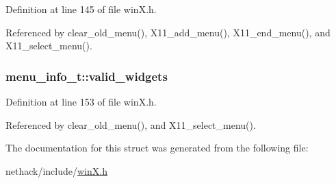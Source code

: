 Definition at line 145 of file win\+X.\+h.



Referenced by clear\+\_\+old\+\_\+menu(), X11\+\_\+add\+\_\+menu(), X11\+\_\+end\+\_\+menu(), and X11\+\_\+select\+\_\+menu().

\hypertarget{structmenu__info__t_ab313bdca14966e71791ea9e53dd3019f}{
\subsubsection[{valid\+\_\+widgets}]{ menu\+\_\+info\+\_\+t\+::valid\+\_\+widgets}}\label{structmenu__info__t_ab313bdca14966e71791ea9e53dd3019f}


Definition at line 153 of file win\+X.\+h.



Referenced by clear\+\_\+old\+\_\+menu(), and X11\+\_\+select\+\_\+menu().



The documentation for this struct was generated from the following file\+:\begin{DoxyCompactItemize}
\item 
nethack/include/\hyperlink{winX_8h}{win\+X.\+h}\end{DoxyCompactItemize}

